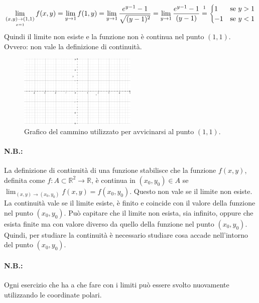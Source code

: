 \begin{example}
    \begin{equation*}
        \lim_{\underset{x=1}{(x,y)\rightarrow(1,1)}}f(x,y)=\lim_{y\rightarrow 1}f(1,y)=\lim_{y\rightarrow 1}\frac{e^{y-1}-1}{\sqrt{(y-1)^2}}=\lim_{y\rightarrow 1}\frac{e^{y-1}-1}{(y-1)}\overset{\footnotemark}{=}
        \begin{cases}
            1 &\text{se } y>1\\
            -1 &\text{se } y<1
        \end{cases}
    \end{equation*}
    Quindi il limite non esiste e la funzione non è continua nel punto $(1,1)$. Ovvero: non vale la definizione di continuità.
    \begin{figure}
    \centering
    \includegraphics[width=0.5\textwidth]{Analisi2/figures/esempio_f_1_y.jpg}
    \caption{Grafico del cammino utilizzato per avvicinarsi al punto $(1,1)$.}\label{fig:esempio_f_1_y}
    \end{figure}
\end{example}

\paragraph{N.B.:} La definizione di continuità di una funzione stabilisce che la funzione $f(x,y)$, definita come $f\colon A\subset\mathbb R^2\rightarrow\mathbb R$, è continua in $(x_0, y_0)\in A$ se $\lim_{(x, y)\rightarrow (x_0,y_0)}f(x,y)=f(x_0, y_0)$. Questo non vale se il limite non esiste. La continuità vale se il limite esiste, è finito e coincide con il valore della funzione nel punto $(x_0, y_0)$. Può capitare che il limite non esista, sia infinito, oppure che esista finite ma con valore diverso da quello della funzione nel punto $(x_0, y_0)$. Quindi, per studiare la continuità è necessario studiare cosa accade nell'intorno del punto $(x_0, y_0)$.

\paragraph{N.B.:} Ogni esercizio che ha a che fare con i limiti può essere svolto nuovamente utilizzando le coordinate polari.

